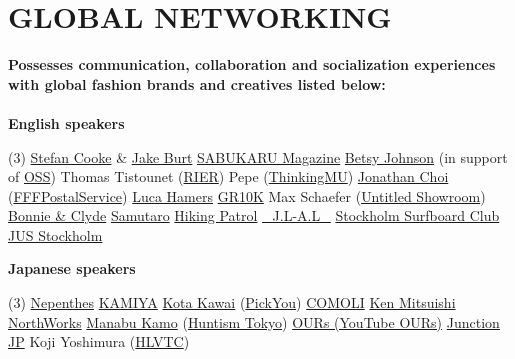 \documentclass[a4paper,10pt]{extarticle}
\begin{document}
\section*{GLOBAL NETWORKING}
\textbf{Possesses communication, collaboration and socialization experiences with global fashion brands and creatives listed below:}\\\\
\noindent
{\textbf{English speakers}}
\begin{tasks}[style=itemize](3)
	\task \href{https://instagram.com/stefan_cooke}{Stefan Cooke} \& \href{https://instagram.com/jakewkburt}{Jake Burt}
	\task \href{https://instagram.com/sabukaruonline}{SABUKARU Magazine}
	\task \href{https://instagram.com/betsyjohnson_}{Betsy Johnson} (in support of \href{https://instagram.com/ourspecialsupport}{OSS})
	\task Thomas Tistounet (\href{https://instagram.com/rierofficial}{RIER})
	\task Pepe (\href{https://instagram.com/thinkingmu}{ThinkingMU})
	\task \href{https://instagram.com/jccchurro}{Jonathan Choi} (\href{https://instagram.com/fffpostalservice}{FFFPostalService})
	\task \href{https://instagram.com/lucahamers}{Luca Hamers}
	\task \href{https://instagram.com/gr10k}{GR10K}
	\task Max Schaefer (\href{https://instagram.com/untitled.paris}{Untitled Showroom})
	\task \href{https://instagram.com/bonnieclyde}{Bonnie \& Clyde}
	\task \href{https://instagram.com/samutaro}{Samutaro}
	\task \href{https://instagram.com/hikingpatrol}{Hiking Patrol}
	\task \href{https://instagram.com/_j.l_a.l_}{\_J.L-A.L\_}
	\task \href{https://instagram.com/stockholmsurfboardclub}{Stockholm Surfboard Club}
	\task \href{https://instagram.com/jus_sthlm}{JUS Stockholm}
\end{tasks}

\noindent
{\textbf{Japanese speakers}}
\begin{tasks}[style=itemize](3)
	\task \href{https://instagram.com/nepenthes.official}{Nepenthes}
	\task \href{https://instagram.com/kamiya___official}{KAMIYA}
	\task \href{https://www.instagram.com/_kotakawai/}{Kota Kawai} (\href{https://instagram.com/pickyou.app}{PickYou})
	\task \href{https://instagram.com/comoli_archive}{COMOLI}
	\task \href{https://instagram.com/kenmitsuishi_official}{Ken Mitsuishi}
	\task \href{https://instagram.com/northworksfolk}{NorthWorks}
	\task \href{https://instagram.com/mr13brain}{Manabu Kamo} (\href{https://instagram.com/huntism_tokyo}{Huntism Tokyo})
	\task \href{https://www.youtube.com/@OURs8888}{OURs (YouTube OURs)}
	\task \href{https://www.instagram.com/junction.jp_kr/}{Junction JP}
	\task Koji Yoshimura (\href{https://www.instagram.com/hlvtc.jp/}{HLVTC})
\end{tasks}
\end{document}
